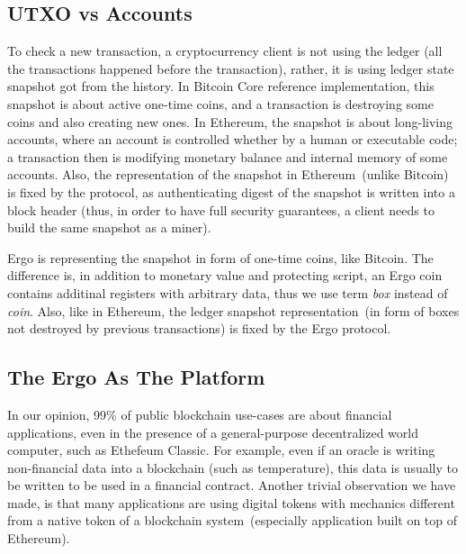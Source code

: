 \subsection{UTXO vs Accounts}
 \label{sec:utxo}

 To check a new transaction, a cryptocurrency client is not using the ledger (all the transactions happened before the
 transaction), rather, it is using ledger state snapshot got from the history. In Bitcoin Core reference implementation,
 this snapshot is about active one-time coins, and a transaction is destroying some coins and also creating new ones.
 In Ethereum, the snapshot is about long-living accounts, where an account is controlled whether by a human or
 executable code; a transaction then is modifying monetary balance and internal memory of some accounts. Also, the
 representation of the snapshot in Ethereum~(unlike Bitcoin) is fixed by the protocol, as authenticating digest of the
 snapshot is written into a block header (thus, in order to have full security guarantees, a client needs to build
 the same snapshot as a miner).

 Ergo is representing the snapshot in form of one-time coins, like Bitcoin. The difference is, in addition to monetary
 value and protecting script, an Ergo coin contains additinal registers with arbitrary data, thus we use term {\em box}
 instead of {\em coin}. Also, like in Ethereum, the ledger snapshot representation~(in form of boxes not destroyed by
 previous transactions) is fixed by the Ergo protocol.

\subsection{The Ergo As The Platform}
 \label{sec:platform}

 In our opinion, 99\% of public blockchain use-cases are about financial applications, even in the presence of a
 general-purpose decentralized world computer, such as Ethefeum Classic. For example, even if an oracle is writing
 non-financial data into a blockchain (such as temperature), this data is usually to be written to be used in a financial
 contract. Another trivial observation we have made, is that many applications are using digital tokens with mechanics
 different from a native token of a blockchain system~(especially application built on top of Ethereum).


